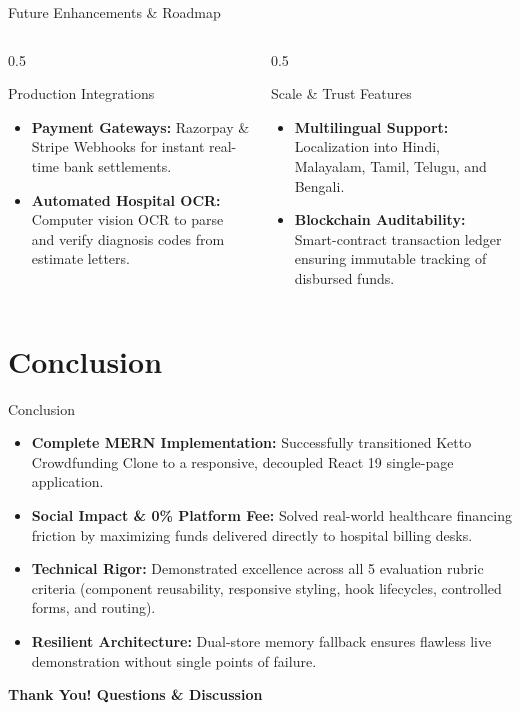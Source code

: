 \documentclass[aspectratio=169, 10pt]{beamer}
\begin{document}
\begin{frame}{Future Enhancements \& Roadmap}
  \begin{columns}[T]
    \begin{column}{0.5\textwidth}
      \begin{block}{Production Integrations}
        \begin{itemize}
          \item \textbf{Payment Gateways:} Razorpay \& Stripe Webhooks for instant real-time bank settlements.
          \item \textbf{Automated Hospital OCR:} Computer vision OCR to parse and verify diagnosis codes from estimate letters.
        \end{itemize}
      \end{block}
    \end{column}
    \begin{column}{0.5\textwidth}
      \begin{exampleblock}{Scale \& Trust Features}
        \begin{itemize}
          \item \textbf{Multilingual Support:} Localization into Hindi, Malayalam, Tamil, Telugu, and Bengali.
          \item \textbf{Blockchain Auditability:} Smart-contract transaction ledger ensuring immutable tracking of disbursed funds.
        \end{itemize}
      \end{exampleblock}
    \end{column}
  \end{columns}
\end{frame}

\section{Conclusion}

\begin{frame}{Conclusion}
  \begin{itemize}
    \item \textbf{Complete MERN Implementation:} Successfully transitioned Ketto Crowdfunding Clone to a responsive, decoupled React 19 single-page application.
    \item \textbf{Social Impact & 0\% Platform Fee:} Solved real-world healthcare financing friction by maximizing funds delivered directly to hospital billing desks.
    \item \textbf{Technical Rigor:} Demonstrated excellence across all 5 evaluation rubric criteria (component reusability, responsive styling, hook lifecycles, controlled forms, and routing).
    \item \textbf{Resilient Architecture:} Dual-store memory fallback ensures flawless live demonstration without single points of failure.
  \end{itemize}
  \vspace{0.8cm}
  \centering
  {\Large\bfseries\color{KettoDarkTeal} Thank You! Questions \& Discussion \par}
\end{frame}
\end{document}
